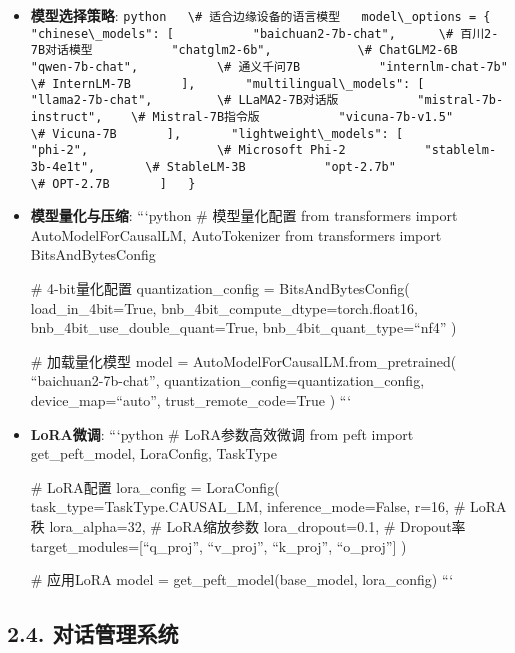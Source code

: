 \begin{itemize}
\item
  \textbf{模型选择策略}:
  \passthrough{\lstinline!python   \# 适合边缘设备的语言模型   model\_options = \{       "chinese\_models": [           "baichuan2-7b-chat",      \# 百川2-7B对话模型           "chatglm2-6b",            \# ChatGLM2-6B           "qwen-7b-chat",           \# 通义千问7B           "internlm-chat-7b"        \# InternLM-7B       ],       "multilingual\_models": [           "llama2-7b-chat",         \# LLaMA2-7B对话版           "mistral-7b-instruct",    \# Mistral-7B指令版           "vicuna-7b-v1.5"          \# Vicuna-7B       ],       "lightweight\_models": [           "phi-2",                  \# Microsoft Phi-2           "stablelm-3b-4e1t",       \# StableLM-3B           "opt-2.7b"                \# OPT-2.7B       ]   \}!}
\item
  \textbf{模型量化与压缩}: ```python \# 模型量化配置 from transformers
  import AutoModelForCausalLM, AutoTokenizer from transformers import
  BitsAndBytesConfig

  \# 4-bit量化配置 quantization\_config = BitsAndBytesConfig(
  load\_in\_4bit=True, bnb\_4bit\_compute\_dtype=torch.float16,
  bnb\_4bit\_use\_double\_quant=True, bnb\_4bit\_quant\_type=``nf4'' )

  \# 加载量化模型 model = AutoModelForCausalLM.from\_pretrained(
  ``baichuan2-7b-chat'', quantization\_config=quantization\_config,
  device\_map=``auto'', trust\_remote\_code=True ) ```
\item
  \textbf{LoRA微调}: ```python \# LoRA参数高效微调 from peft import
  get\_peft\_model, LoraConfig, TaskType

  \# LoRA配置 lora\_config = LoraConfig( task\_type=TaskType.CAUSAL\_LM,
  inference\_mode=False, r=16, \# LoRA秩 lora\_alpha=32, \# LoRA缩放参数
  lora\_dropout=0.1, \# Dropout率 target\_modules={[}``q\_proj'',
  ``v\_proj'', ``k\_proj'', ``o\_proj''{]} )

  \# 应用LoRA model = get\_peft\_model(base\_model, lora\_config) ```
\end{itemize}

\subsection{2.4.
对话管理系统}\label{ux5bf9ux8bddux7ba1ux7406ux7cfbux7edf}

